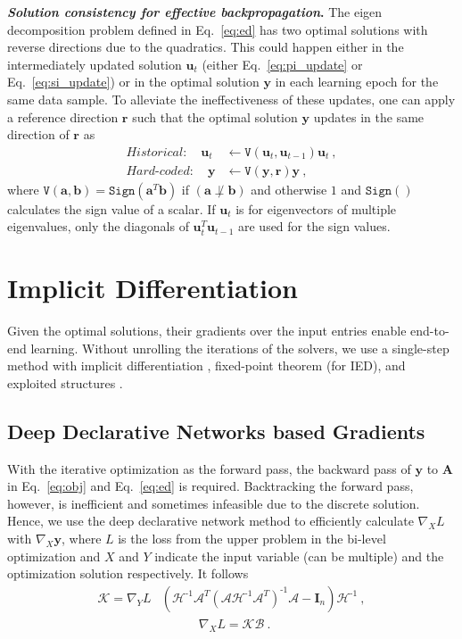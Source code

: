 \documentclass{article}
\newcommand{\mb}[1]{\mathbf{#1}}
\newcommand{\mc}[1]{\mathcal{#1}}
\newcommand{\inv}{^{\text{-}1}}
\theoremstyle{plain}
\theoremstyle{definition}
\theoremstyle{remark}
\begin{document}
\textbf{\textit{Solution consistency for effective backpropagation}.}
The eigen decomposition problem defined in Eq.~\eqref{eq:ed} has two optimal solutions with reverse directions due to the quadratics.
This could happen either in the intermediately updated solution $\mb{u}_t$ (either Eq.~\eqref{eq:pi_update} or Eq.~\eqref{eq:si_update}) or in the optimal solution $\mb{y}$ in each learning epoch for the same data sample.
To alleviate the ineffectiveness of these updates, one can apply a reference direction $\mb{r}$
such that the optimal solution $\mb{y}$ updates in the same direction of $\mb{r}$ as
%
\begin{align}
    \textit{Historical}: \quad \mb{u}_t &\leftarrow \texttt{V}\left( \mb{u}_t, \mb{u}_{t-1} \right) \mb{u}_t\ ,\\
    \textit{Hard-coded}: \quad \mb{y} &\leftarrow \texttt{V}\left( \mb{y}, \mb{r} \right) \mb{y}\ ,
\end{align}
where $\texttt{V}(\mb{a}, \mb{b})=\texttt{Sign} \left( \mb{a}^T \mb{b} \right)$ if $(\mb{a} \not\perp \mb{b})$ and otherwise $1$ and $\texttt{Sign}()$ calculates the sign value of a scalar. If $\mb{u}_t$ is for eigenvectors of multiple eigenvalues, only the diagonals of $\mb{u}_t^T \mb{u}_{t-1}$ are used for the sign values.
\vspace{-2mm}

\section{Implicit Differentiation}
Given the optimal solutions, their gradients over the input entries enable end-to-end learning.
Without unrolling the iterations of the solvers, we use a single-step method with implicit differentiation \cite{ddn}, fixed-point theorem (for IED), and exploited structures \cite{exploit}.

\subsection{Deep Declarative Networks based Gradients}
\label{sec:ddn}
With the iterative optimization as the forward pass, the backward pass of $\mb{y}$ to $\mb{A}$ in Eq.~\eqref{eq:obj} and Eq.~\eqref{eq:ed} is required.
Backtracking the forward pass, however, is inefficient and sometimes infeasible due to the discrete solution.
Hence, we use the deep declarative network method \cite{ddn} to efficiently calculate $\nabla_X L$ with $\nabla_X \mb{y}$, where $L$ is the loss from the upper problem in the bi-level optimization and $X$ and $Y$ indicate the input variable (can be multiple) and the optimization solution respectively.
It follows
%
\begin{align}
\mc{K} = \nabla_Y L &\left( \mc{H}\inv \mc{A}^T \left( \mc{A} \mc{H}\inv \mc{A}^T \right)\inv \mc{A} - \mb{I}_n \right) \mc{H}\inv \label{eq:k_comp} \ ,\\
&\qquad \quad \nabla_X L = \mc{K} \mc{B} \label{eq:backward_ddn}\ .
\end{align}
\end{document}
